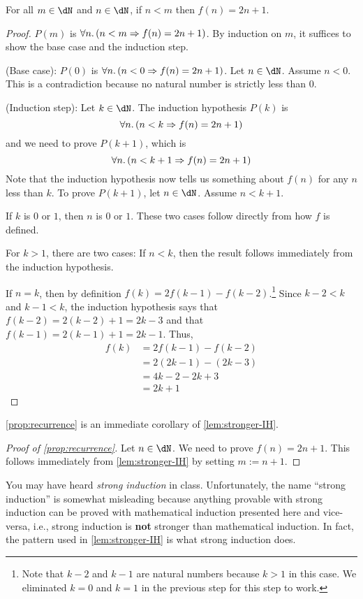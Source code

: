 \documentclass{amsart}
\begin{document}
\begin{lem}\label{lem:stronger-IH}
  For all $m \in \dN$ and $n \in \dN$, if $n < m$ then $f(n) = 2n + 1$.
\end{lem}
\begin{proof}
  $P(m)$ is $\forall n.\,(n < m \Rightarrow f(n) = 2n + 1)$.
  By induction on $m$, it suffices to show the base case and the induction step.

  (Base case): $P(0)$ is $\forall n.\,(n < 0 \Rightarrow f(n) = 2n + 1)$.
  Let $n \in \dN$.
  Assume $n < 0$.
  This is a contradiction because no natural number is strictly less than $0$.

  (Induction step): Let $k \in \dN$.
  The induction hypothesis $P(k)$ is
  \[
    \forall n.\,(n < k \Rightarrow f(n) = 2n + 1)
  \]
  and we need to prove $P(k+1)$, which is
  \[
    \forall n.\,(n < k + 1 \Rightarrow f(n) = 2n + 1)
  \]
  Note that the induction hypothesis now tells us something about $f(n)$ for any $n$ less than $k$.
  To prove $P(k+1)$, let $n \in \dN$.
  Assume $n < k + 1$.
  
  If $k$ is $0$ or $1$, then $n$ is $0$ or $1$.
  These two cases follow directly from how $f$ is defined.

  For $k > 1$, there are two cases:
  If $n < k$, then the result follows immediately from the induction hypothesis.
  
  If $n = k$, then by definition $f(k) = 2f(k-1) - f(k-2)$.\footnote{Note that $k-2$ and $k-1$ are natural numbers because $k > 1$ in this case. We eliminated $k = 0$ and $k = 1$ in the previous step for this step to work.}
  Since $k - 2 < k$ and $k - 1 < k$, the induction hypothesis says that $f(k-2) = 2(k-2) + 1 = 2k - 3$ and that $f(k-1) = 2(k-1) + 1 = 2k - 1$.
  Thus,
  \begin{align}
    f(k) &= 2f(k-1) - f(k-2)\\
         &= 2(2k - 1) - (2k - 3)\\
         &= 4k - 2 - 2k + 3\\
         &= 2k + 1
  \end{align}
\end{proof}

\cref{prop:recurrence} is an immediate corollary of \cref{lem:stronger-IH}.
\begin{proof}[Proof of \cref{prop:recurrence}]
  Let $n \in \dN$.
  We need to prove $f(n) = 2n + 1$.
  This follows immediately from \cref{lem:stronger-IH} by setting $m := n + 1$.
\end{proof}

You may have heard \emph{strong induction} in class.
Unfortunately, the name ``strong induction'' is somewhat misleading because anything provable with strong induction can be proved with mathematical induction presented here and vice-versa, i.e., strong induction is \textbf{not} stronger than mathematical induction.
In fact, the pattern used in \cref{lem:stronger-IH} is what strong induction does.
\end{document}

